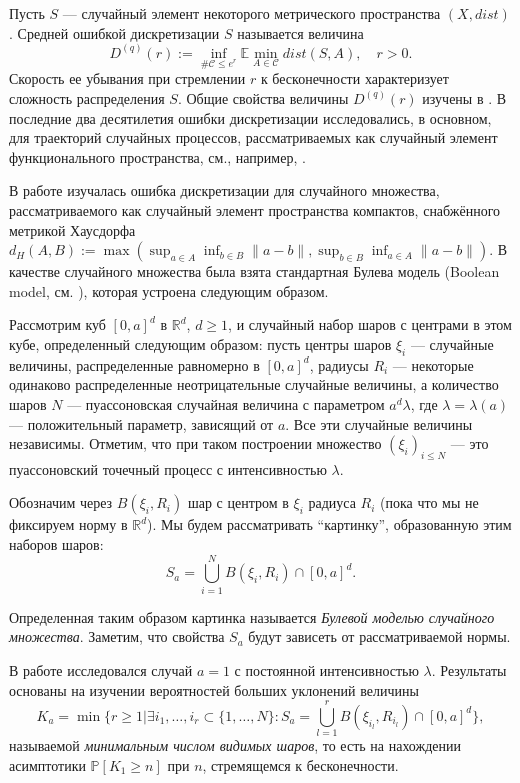 \documentclass[12pt]{article}
\theoremstyle{plain}
\theoremstyle{definition}
\theoremstyle{remark}
\def\geq{\geqslant}
\def\leq{\leqslant}
\newcommand{\cuplim}{\bigcup\limits}
\newcommand{\R}{\mathbb{R}}
\newcommand{\PP}{\mathbb{P}}
\newcommand{\E}{\mathbb{E}}
\begin{document}
Пусть $S$  ---  случайный элемент некоторого метрического пространства $(X, dist)$.
Средней ошибкой дискретизации $S$ называется величина  $$D^{(q)}(r) := \inf\limits_{\#\mathcal{C}\leq e^r}\E \min\limits_{A\in\mathcal{C}}dist(S, A), \quad r>0.$$ 
Скорость ее убывания при  стремлении $r$ к бесконечности характеризует сложность распределения $S$. 
Общие свойства величины $D^{(q)}(r)$ изучены в \cite{GL, CT, Kolm}.
В последние два десятилетия ошибки дискретизации исследовались, в основном,
для траекторий случайных процессов, рассматриваемых как случайный элемент функционального пространства, см., например, \cite{ADSV, Der}. 

В работе \cite{AL} изучалась ошибка дискретизации для случайного множества,
рассматриваемого как случайный элемент пространства компактов, снабжённого метрикой Хаусдорфа $d_H(A, B) := \max(\sup_{a\in A}\inf_{b\in B}\|a - b\|, \sup_{b\in B}\inf_{a\in A}\|a - b\|)$.
В качестве случайного множества была взята стандартная Булева модель (Boolean model, см. \cite{CSKM, SW}), которая
устроена следующим образом.

Рассмотрим куб $[0,a]^d$ в $\R^d$, $d \geq 1$, и  случайный набор шаров с центрами в этом кубе, определенный следующим образом: пусть  центры шаров $\xi_i$ ---  случайные величины, распределенные равномерно в $[0,a]^d$, радиусы $R_i$ --- некоторые одинаково распределенные неотрицательные случайные величины, а количество шаров $N$ --- пуассоновская случайная величина с параметром $a^d\lambda$, где $\lambda = \lambda(a)$ --- положительный параметр, зависящий от $a$. Все эти случайные величины независимы. Отметим, что при таком построении множество $(\xi_i)_{i\leq N}$ --- это пуассоновский точечный процесс с интенсивностью $\lambda$.

Обозначим через $B(\xi_i, R_i)$ шар с центром в $\xi_i$ радиуса $R_i$ (пока что мы не фиксируем норму в $\R^d$).
Мы будем рассматривать  ``картинку'', образованную этим наборов шаров:
$$S_a = \cuplim_{i=1}^N B(\xi_i, R_i) \cap [0,a]^d.$$

Определенная таким образом картинка называется {\it Булевой моделью случайного множества}.
Заметим, что свойства $S_a$ будут зависеть от рассматриваемой нормы.

 В работе \cite{AL} исследовался случай $a=1$ с постоянной интенсивностью $\lambda$. Результаты   основаны на изучении вероятностей  больших уклонений величины  $$K_a = \min \{r \geq 1 | \exists i_1, \ldots , i_r \subset \{1, \ldots , N\} : S_a = \cuplim_{l=1}^r B(\xi_{i_l}, R_{i_l}) \cap [0,a]^d\},$$
называемой {\it минимальным числом видимых шаров}, то есть на нахождении асимптотики $\PP[K_1 \geq n]$ при $n$, стремящемся к бесконечности. 
\end{document}
